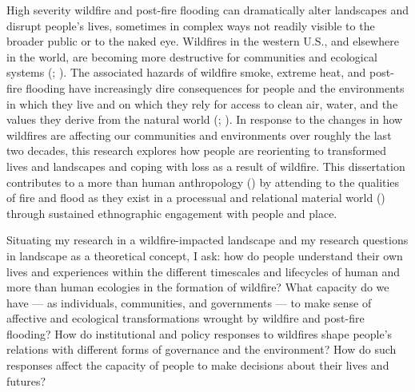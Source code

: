 \documentclass[
]{article}
\begin{document}
High severity wildfire and post-fire flooding can dramatically alter landscapes and disrupt people's lives, sometimes in complex ways not readily visible to the broader public or to the naked eye. Wildfires in the western U.S., and elsewhere in the world, are becoming more destructive for communities and ecological systems (; ). The associated hazards of wildfire smoke, extreme heat, and post-fire flooding have increasingly dire consequences for people and the environments in which they live and on which they rely for access to clean air, water, and the values they derive from the natural world (; ). In response to the changes in how wildfires are affecting our communities and environments over roughly the last two decades, this research explores how people are reorienting to transformed lives and landscapes and coping with loss as a result of wildfire. This dissertation contributes to a more than human anthropology () by attending to the qualities of fire and flood as they exist in a processual and relational material world () through sustained ethnographic engagement with people and place.

Situating my research in a wildfire-impacted landscape and my research questions in landscape as a theoretical concept, I ask: how do people understand their own lives and experiences within the different timescales and lifecycles of human and more than human ecologies in the formation of wildfire? What capacity do we have --- as individuals, communities, and governments --- to make sense of affective and ecological transformations wrought by wildfire and post-fire flooding? How do institutional and policy responses to wildfires shape people's relations with different forms of governance and the environment? How do such responses affect the capacity of people to make decisions about their lives and futures?
\end{document}
